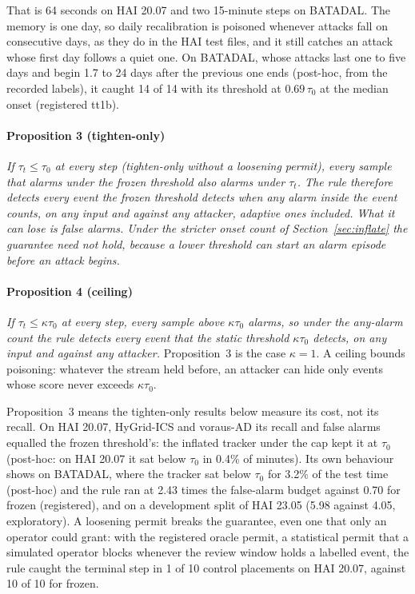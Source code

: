 \documentclass[letterpaper,twocolumn,10pt]{article}
\begin{document}
That is 64 seconds on HAI 20.07 and two 15-minute steps on BATADAL. The memory is one day, so daily
recalibration is poisoned whenever attacks fall on consecutive days, as they do in the HAI test
files, and it still catches an attack whose first day follows a quiet one. On BATADAL, whose attacks
last one to five days and begin 1.7 to 24 days after the previous one ends (post-hoc, from the recorded
labels), it caught 14 of 14 with its threshold at $0.69\,\tau_0$ at the median onset (registered tt1b).

\paragraph{Proposition 3 (tighten-only)} \emph{If $\tau_t \le \tau_0$ at every step (tighten-only
without a loosening permit), every sample that alarms under the frozen threshold also alarms under
$\tau_t$. The rule therefore detects every event the frozen threshold detects when any alarm inside the
event counts, on any input and against any attacker, adaptive ones included. What it can lose is false
alarms. Under the stricter onset count of Section~\ref{sec:inflate} the guarantee need not hold,
because a lower threshold can start an alarm episode before an attack begins.}

\paragraph{Proposition 4 (ceiling)} \emph{If $\tau_t \le \kappa\tau_0$ at every step, every sample above
$\kappa\tau_0$ alarms, so under the any-alarm count the rule detects every event that the static
threshold $\kappa\tau_0$ detects, on any input and against any attacker.} Proposition~3 is the case
$\kappa = 1$. A ceiling bounds poisoning: whatever the stream held before, an attacker can hide only
events whose score never exceeds $\kappa\tau_0$.

Proposition~3 means the tighten-only results below measure its cost, not its recall. On HAI 20.07,
HyGrid-ICS and voraus-AD its recall and false alarms equalled the frozen threshold's: the inflated
tracker under the cap kept it at $\tau_0$ (post-hoc: on HAI 20.07 it sat below $\tau_0$ in 0.4\% of
minutes). Its own behaviour shows on BATADAL, where the tracker sat below $\tau_0$ for 3.2\% of the
test time (post-hoc) and the rule ran at 2.43 times the false-alarm budget against 0.70 for frozen
(registered), and on a development split of HAI 23.05 (5.98 against 4.05, exploratory). A loosening
permit breaks the guarantee, even one that only an operator could grant: with the registered oracle
permit, a statistical permit that a simulated operator blocks whenever the review window holds a
labelled event, the rule caught the terminal step in 1 of 10 control placements on HAI 20.07, against
10 of 10 for frozen.
\end{document}
